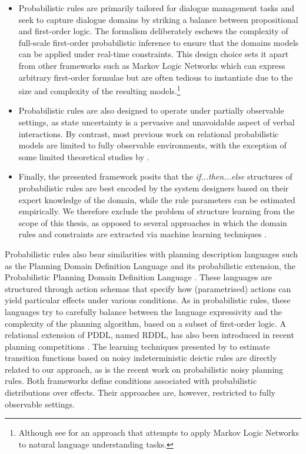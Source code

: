 \begin{itemize}

\item Probabilistic rules are primarily tailored for dialogue management tasks and seek to capture dialogue domains by striking a balance between propositional and first-order logic. The formalism deliberately eschews the complexity of full-scale first-order probabilistic inference to ensure that the domains models can be applied under real-time constraints. This design choice sets it apart from other frameworks such as Markov Logic Networks which can express arbitrary first-order formulae but are often tedious to instantiate due to the size and complexity of the resulting models.\footnote{Although see \cite{Kennington:2012} for an approach that attempts to apply Markov Logic Networks to natural language understanding tasks.} 

\item Probabilistic rules are also designed to operate under partially observable settings, as state uncertainty is a pervasive and unavoidable aspect of verbal interactions.  By contrast, most previous work on relational probabilistic models are limited to fully observable environments, with the exception of some limited theoretical studies by \cite{Wang:2010,SannerK10}. 

\item Finally, the presented framework posits that the \textit{if...then...else} structures of probabilistic rules are best encoded by the system designers based on their expert knowledge of the domain, while the rule parameters can be estimated empirically. We therefore exclude the problem of structure learning from the scope of this thesis, as opposed to several approaches in which the domain rules and constraints are extracted via machine learning techniques \citep{PasulaZK07,Kok:2009}.

\end{itemize}

Probabilistic rules also bear similarities with planning description languages such as the Planning Domain Definition Language \citep[PDDL, see ][]{mcdermott1998} and its probabilistic extension, the Probabilistic Planning Domain Definition Language \citep[PPDDL, see ][]{younes2004ppddl1}.  These languages are structured through action schemas that specify how (parametrised) actions can yield particular effects under various conditions. As in probabilistic rules, these languages try to carefully balance between the language expressivity and the complexity of the planning algorithm, based on a subset of first-order logic. A relational extension of PDDL, named RDDL, has also been introduced in recent planning competitions \citep{Sanner:RDDL}. The learning techniques presented by \cite{PasulaZK07} to estimate transition functions based on noisy indeterministic deictic rules are directly related to our approach, as is the recent work \cite{lang10jair} on probabilistic noisy planning rules.   Both frameworks define conditions associated with probabilistic distributions over effects. Their approaches are, however, restricted to fully observable settings. 

